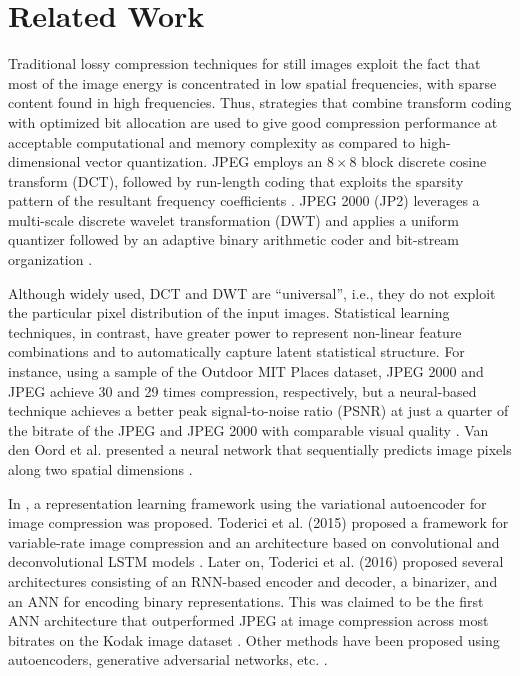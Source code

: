\documentclass[smallabstract,smallcaptions]{dccpaper}
\begin{document}
\section{Related Work}
\label{related_work}
Traditional lossy compression techniques for still images exploit the fact that most of the image energy is concentrated in low spatial frequencies, with sparse content found in high frequencies. Thus, strategies that combine transform coding with optimized bit allocation are used to give good compression performance at acceptable computational and memory complexity as compared to high-dimensional vector quantization. JPEG employs an $8\times8$ block discrete cosine transform (DCT), followed by run-length coding that exploits the sparsity pattern of the resultant frequency coefficients \cite{wallace1991jpegstandard}. %
JPEG 2000 (JP2) leverages a multi-scale discrete wavelet transformation (DWT) and applies a uniform quantizer followed by an adaptive binary arithmetic coder and bit-stream organization \cite{rabbani2002jpeg2000}. %

Although widely used, DCT and DWT are ``universal'', i.e., they do not exploit the particular pixel distribution of the input images. Statistical learning techniques, in contrast, have greater power to represent non-linear feature combinations and to automatically capture latent statistical structure. %
For instance, using a sample of the Outdoor MIT Places dataset, JPEG 2000 and JPEG achieve 30 and 29 times compression, respectively, but a neural-based technique achieves a better peak signal-to-noise ratio (PSNR) at just a quarter of the bitrate of the JPEG and JPEG 2000 with comparable visual quality \cite{toderici2016full}. Van den Oord et al. presented a neural network that sequentially predicts image pixels along two spatial dimensions \cite{oord2016pixel}.

In \cite{gregor2016conceptualcompression}, a representation learning framework using the variational autoencoder for image compression was proposed. Toderici et al. (2015) proposed a framework for variable-rate image compression and an architecture based on convolutional and deconvolutional LSTM models \cite{toderici2015}. Later on, Toderici et al. (2016) proposed several architectures consisting of an RNN-based encoder and decoder, a binarizer, and an ANN for encoding binary representations. This was claimed to be the first ANN architecture that outperformed JPEG at image compression across most bitrates on the Kodak image dataset \cite{toderici2016full}. Other methods have been proposed using autoencoders, generative adversarial networks, etc. \cite{Theis2017,rippel2017real}. %
\end{document}
